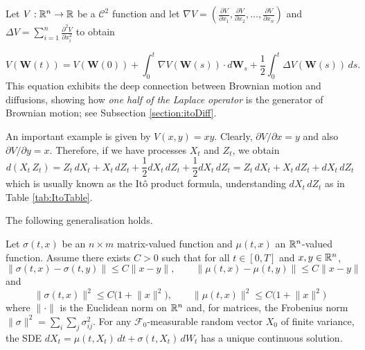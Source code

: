\begin{example}
    
Let $V : \mathbb{R}^n \rightarrow \mathbb{R} $ be a  $\mathcal{C}^2$ function and let  $\nabla V = (\frac{\partial  V}{ \partial x_1}, \frac{\partial  V}{ \partial x_2}, \dots, \frac{\partial  V}{ \partial x_n})$ and $\Delta V = \sum_{i= 1}^n \frac {\partial^2 V}{\partial x_ i ^2}  $ to obtain

$$
V(\mathbf{W}(t)) = V(\mathbf{W}(0)) + \int_0^t \nabla V (\mathbf{W}(s)) \cdot d\mathbf{W}_s + \frac{1}{2}\int_0 ^t \Delta V (\mathbf{W}(s)) \, ds.
$$
This equation exhibits the deep connection between Brownian motion and diffusions, showing how \emph{one half of the Laplace operator} is the generator of Brownian motion; see Subsection \ref{section:itoDiff}.


\end{example}
\begin{example}
    An important example is given by $V(x,y) = xy.$ Clearly, $\partial V / \partial x = y$ and also $\partial V / \partial y = x$. Therefore, if we have processes $X_t$ and $Z_t$, we obtain
    \begin{equation}
        d(X_t\,Z_t) = Z_t\,dX_t + X_t\,dZ_t + \frac 1 2 dX_t\, dZ_t+ \frac 1 2 dX_t\, dZ_t=Z_t\,dX_t + X_t\,dZ_t + dX_t\, dZ_t
    \end{equation}
    which is usually known as the Itô product formula, understanding $dX_t\,dZ_t$ as in Table \ref{tab:ItoTable}.
\end{example}

The following generalisation holds.

\begin{theorem} \label{theorem:solutions:ndimensional_sde}
    Let $\sigma(t,x)$ be an $n\times m$ matrix-valued function and $\mu(t,x)$ an $\mathbb{R}^n$-valued function. Assume there exists $C>0$ such that for all $t\in[0,T]$ and $x,y \in \mathbb{R}^n$, 
    $$
    \lVert \sigma (t,x) - \sigma(t,y) \rVert \leq C \lVert x - y\rVert , \qquad \lVert\mu(t,x) - \mu(t,y)\rVert \leq C\lVert x-y\rVert
    $$
    and
    $$
    \lVert \sigma(t,x)\rVert ^2 \leq C\bigl(1+\lVert x\rVert^2\bigr) , \qquad \lVert\mu(t,x)\rVert ^2 \leq C\bigl(1+\lVert x\rVert^2\bigr)
    $$
    where $\lVert\cdot\rVert$ is the Euclidean norm on $\mathbb{R}^n$ and, for matrices, the Frobenius norm $\lVert \sigma \rVert^2 = \sum_i \sum_j \sigma_{ij}^2$. For any $\mathcal{F}_0$-measurable random vector $X_0$ of finite variance, the SDE $dX_t = \mu(t,X_t) \, dt +  \sigma(t,X_t) \, dW_t$ has a unique continuous solution. \qedopentext
\end{theorem}


